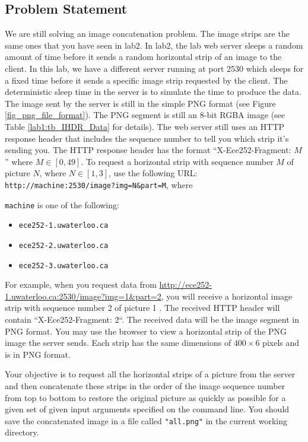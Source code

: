 \subsection{Problem Statement}
We are still solving an image concatenation problem. The image strips are the same ones that you have seen in lab2. In lab2, the lab web server sleeps a random amount of time before it sends a random horizontal strip of an image to the client. In this lab, we have a different server running at port 2530 which sleeps for a fixed time before it sends a specific image strip requested by the client. The deterministic sleep time in the server is to simulate the time to produce the data. The image sent by the server is still in the simple PNG format (see Figure \ref{fig_png_file_format}). The PNG segment is still an 8-bit RGBA image (see Table \ref{lab1:tb_IHDR_Data} for details). The web server still uses an HTTP response header that includes the sequence number to tell you which strip it's sending you. The HTTP response header has the format ``X-Ece252-Fragment: $M$'' where $M \in [0, 49]$. To request a  horizontal strip with sequence number $M$ of picture $N$, where $N\in[1, 3]$, use the following URL:
\verb+http://machine:2530/image?img=N&part=M+, where

\texttt{machine} is one of the following:
\begin{itemize}
\item \texttt{ece252-1.uwaterloo.ca}
\item \texttt{ece252-2.uwaterloo.ca}
\item \texttt{ece252-3.uwaterloo.ca}
\end{itemize}

For example, when you request data from
\url{http://ece252-1.uwaterloo.ca:2530/image?img=1\&part=2}, 
you will receive a horizontal image strip with sequence number 2 of picture 1 . The received HTTP header will contain ``X-Ece252-Fragment: 2``. The received data will be the image segment in PNG format.
You may use the browser to view a horizontal strip of the PNG image the server sends. Each strip has the same dimensions of $400 \times 6$ pixels and is in PNG format. 

Your objective is to request all the horizontal strips of a picture from the server and then concatenate these strips in the order of the image sequence number from top to bottom to restore the original picture as quickly as possible for a given set of given input arguments specified on the command line. You should save the concatenated image in a file called \verb+"all.png"+ in the current working directory.


